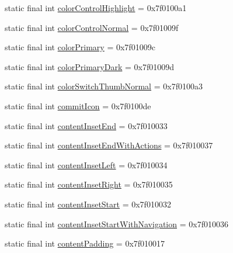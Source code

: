 \begin{CompactItemize}
static final int \hyperlink{classandroid_1_1support_1_1v7_1_1recyclerview_1_1_r_1_1attr_f3efda41d6f85f45c0ad0720650ec9ae}{colorControlHighlight} = 0x7f0100a1
\item 
static final int \hyperlink{classandroid_1_1support_1_1v7_1_1recyclerview_1_1_r_1_1attr_aed60a50a54eca1baadd50b791dba6fb}{colorControlNormal} = 0x7f01009f
\item 
static final int \hyperlink{classandroid_1_1support_1_1v7_1_1recyclerview_1_1_r_1_1attr_92ff67f28d175b1d2cefcdad2a8cf000}{colorPrimary} = 0x7f01009c
\item 
static final int \hyperlink{classandroid_1_1support_1_1v7_1_1recyclerview_1_1_r_1_1attr_0bd6eaf47646f18cca2f2087240a7cae}{colorPrimaryDark} = 0x7f01009d
\item 
static final int \hyperlink{classandroid_1_1support_1_1v7_1_1recyclerview_1_1_r_1_1attr_87d8c5adfd316a6c30182c5ca33fc1ab}{colorSwitchThumbNormal} = 0x7f0100a3
\item 
static final int \hyperlink{classandroid_1_1support_1_1v7_1_1recyclerview_1_1_r_1_1attr_2e4f141299cff663f646011d5a430008}{commitIcon} = 0x7f0100de
\item 
static final int \hyperlink{classandroid_1_1support_1_1v7_1_1recyclerview_1_1_r_1_1attr_e2cd576980926389ede49aa9b5376e87}{contentInsetEnd} = 0x7f010033
\item 
static final int \hyperlink{classandroid_1_1support_1_1v7_1_1recyclerview_1_1_r_1_1attr_6b8a8b6dace8a1ed6ad050ba7f00cb5f}{contentInsetEndWithActions} = 0x7f010037
\item 
static final int \hyperlink{classandroid_1_1support_1_1v7_1_1recyclerview_1_1_r_1_1attr_c09181bf7f5fb10a01dd76c57d9eb239}{contentInsetLeft} = 0x7f010034
\item 
static final int \hyperlink{classandroid_1_1support_1_1v7_1_1recyclerview_1_1_r_1_1attr_6e318cbd8278d09ec6b37690a3545abe}{contentInsetRight} = 0x7f010035
\item 
static final int \hyperlink{classandroid_1_1support_1_1v7_1_1recyclerview_1_1_r_1_1attr_2b30582726df9d03d35cc7f5434424df}{contentInsetStart} = 0x7f010032
\item 
static final int \hyperlink{classandroid_1_1support_1_1v7_1_1recyclerview_1_1_r_1_1attr_e8f852934be708125a7679c2d10cdf0e}{contentInsetStartWithNavigation} = 0x7f010036
\item 
static final int \hyperlink{classandroid_1_1support_1_1v7_1_1recyclerview_1_1_r_1_1attr_a9cd3c692ef756e33f9256379f080dcd}{contentPadding} = 0x7f010017
\item 

\end{CompactItemize}
